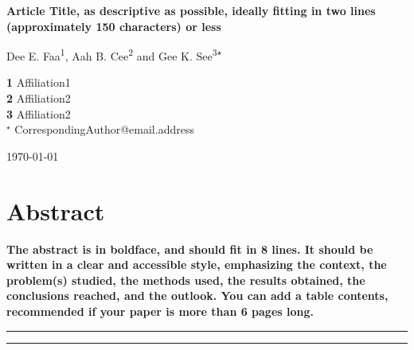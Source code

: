 \documentclass[submission, PhysCodeb]{SciPost}
\begin{document}
\begin{center}{\Large \textbf{
Article Title, as descriptive as possible, ideally fitting in two lines (approximately 150 characters) or less\\
}}\end{center}

\begin{center}
Dee E. Faa\textsuperscript{1},
Aah B. Cee\textsuperscript{2} and
Gee K. See\textsuperscript{3$\star$}
\end{center}

\begin{center}
{\bf 1} Affiliation1
\\
{\bf 2} Affiliation2
\\
{\bf 3} Affiliation2
\\
${}^\star$ {\small \sf CorrespondingAuthor@email.address}
\end{center}

\begin{center}
\today
\end{center}


\section*{Abstract}
{\bf
The abstract is in boldface, and should fit in 8 lines.
It should be written in a clear and accessible style, emphasizing the context, the problem(s) studied, the methods used, the results obtained, the conclusions reached, and the outlook. You can add a table contents, recommended if your paper is more than 6 pages long.
}

\vspace{10pt}
\noindent\rule{\textwidth}{1pt}
\tableofcontents\thispagestyle{fancy}
\noindent\rule{\textwidth}{1pt}
\vspace{10pt}
\end{document}
